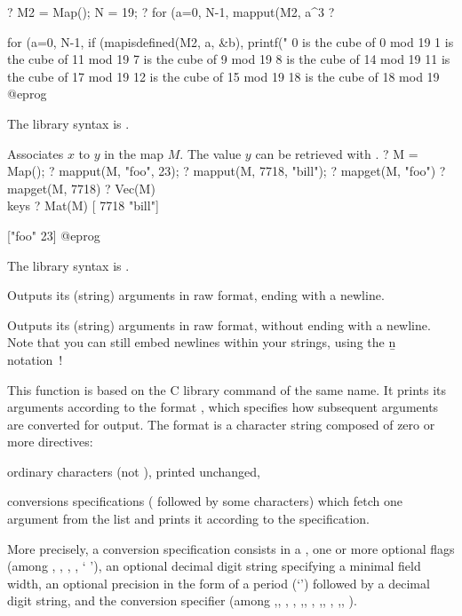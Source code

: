 \bprog
? M2 = Map(); N = 19;
? for (a=0, N-1, mapput(M2, a^3%
? {for (a=0, N-1,
     if (mapisdefined(M2, a, &b),
       printf("%
0 is the cube of 0 mod 19
1 is the cube of 11 mod 19
7 is the cube of 9 mod 19
8 is the cube of 14 mod 19
11 is the cube of 17 mod 19
12 is the cube of 15 mod 19
18 is the cube of 18 mod 19
@eprog

The library syntax is .

\label{se:mapput}
Associates $x$ to $y$ in the map $M$. The value $y$ can be retrieved
with .
\bprog
? M = Map();
? mapput(M, "foo", 23);
? mapput(M, 7718, "bill");
? mapget(M, "foo")
? mapget(M, 7718)
? Vec(M)  \\ keys
? Mat(M)
[ 7718 "bill"]

["foo"     23]
@eprog

The library syntax is .

\label{se:print}
Outputs its (string) arguments in raw format, ending with a newline.

\label{se:print1}
Outputs its (string) arguments in raw
format, without ending with a newline. Note that you can still embed newlines
within your strings, using the \b{n} notation~!

\label{se:printf}
This function is based on the C library command of the same name.
It prints its arguments according to the format , which specifies how
subsequent arguments are converted for output. The format is a
character string composed of zero or more directives:

\item ordinary characters (not \kbd{\%}), printed unchanged,

\item conversions specifications (\kbd{\%} followed by some characters)
which fetch one argument from the list and prints it according to the
specification.

More precisely, a conversion specification consists in a \kbd{\%}, one or more
optional flags (among \kbd{\#}, , \kbd{-}, \kbd{+}, ` '), an optional
decimal digit string specifying a minimal field width, an optional precision
in the form of a period (`') followed by a decimal digit string, and
the conversion specifier (among ,, , ,
,, , ,, , ,, ).

}
